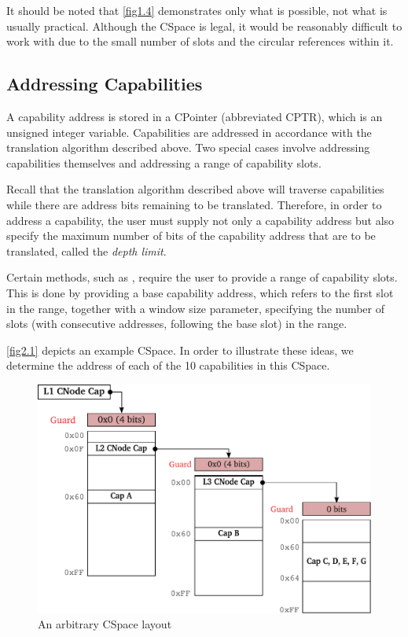 It should be noted that \autoref{fig1.4} demonstrates only what is
possible, not what is usually practical. Although the CSpace is legal,
it would be reasonably difficult to work with due to the small number
of slots and the circular references within it.


\subsection{Addressing Capabilities}
\label{sec:cap_addressing}

A capability address is stored in a CPointer (abbreviated CPTR), which
is an unsigned integer variable. Capabilities are addressed in
accordance with the translation algorithm described above.  Two
special cases involve addressing  capabilities themselves
and addressing a range of capability slots.

Recall that the translation algorithm described above will traverse
 capabilities while there are address bits remaining to be
translated. Therefore, in order to address a  capability,
the user must supply not only a capability address but also specify
the maximum number of bits of the capability address that are to be
translated, called the \emph{depth limit}.

Certain methods, such as
, require the user to
provide a range of capability slots. This is done by providing a base
capability address, which refers to the first slot in the range,
together with a window size parameter, specifying the number of slots
(with consecutive addresses, following the base slot) in the range.


\autoref{fig2.1} depicts an example CSpace. In order to illustrate
these ideas, we determine the address of each of the 10 capabilities
in this CSpace.

\begin{figure}[tb]
  \begin{center}
    \includegraphics[scale=0.5]{figs/fig2-1.pdf}
    \caption{An arbitrary CSpace layout}
    \label{fig2.1}
  \end{center}
\end{figure}


